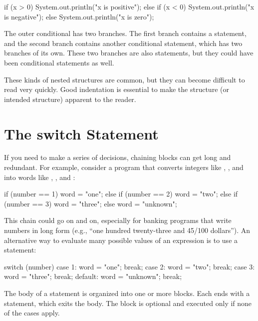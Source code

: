 \begin{code}
if (x > 0) {
    System.out.println("x is positive");
} else {
    if (x < 0) {
        System.out.println("x is negative");
    } else {
        System.out.println("x is zero");
    }
}
\end{code}

The outer conditional has two branches.
The first branch contains a  statement, and the second branch contains another conditional statement, which has two branches of its own.
These two branches are also  statements, but they could have been conditional statements as well.


These kinds of nested structures are common, but they can become difficult to read very quickly.
Good indentation is essential to make the structure (or intended structure) apparent to the reader.


\section{The switch Statement}

If you need to make a series of decisions, chaining  blocks can get long and redundant.
For example, consider a program that converts integers like , , and  into words like , , and :

\begin{code}
if (number == 1) {
    word = "one";
} else if (number == 2) {
    word = "two";
} else if (number == 3) {
    word = "three";
} else {
    word = "unknown";
}
\end{code}


This chain could go on and on, especially for banking programs that write numbers in long form (e.g., ``one hundred twenty-three and 45/100 dollars'').
An alternative way to evaluate many possible values of an expression is to use a  statement:

\begin{code}
switch (number) {
    case 1:
        word = "one";
        break;
    case 2:
        word = "two";
        break;
    case 3:
        word = "three";
        break;
    default:
        word = "unknown";
        break;
}
\end{code}

The body of a  statement is organized into one or more  blocks.
Each  ends with a  statement, which exits the  body.
The  block is optional and executed only if none of the cases apply.

